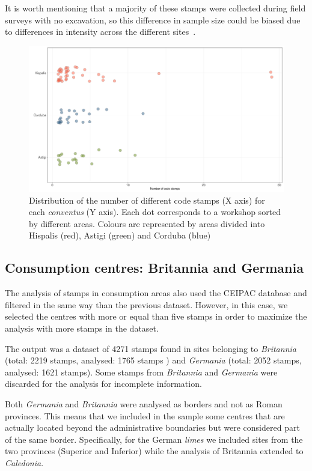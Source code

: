 \documentclass[review]{elsarticle}
\newcommand{\memo}[2]{\textcolor{#1}{#2}}
\newcommand{\xavi}[1]{\memo{magenta}{XRC: #1\\}}
\begin{document}
It is worth mentioning that a majority of these stamps were collected during field surveys with no excavation, so this difference in sample size could be biased due to differences in intensity across the different sites~\citep{arva_1997}.
 
\begin{figure}[htp]
	\centering
\includegraphics[width=\linewidth]{figs/frequency}
\caption{Distribution of the number of different code stamps (X axis) for each \textit{conventus} (Y axis). Each dot corresponds to a workshop sorted by different areas. Colours are represented by areas divided into Hispalis (red), Astigi (green) and Corduba (blue)}
\label{frequency}
\end{figure} 



\subsection{Consumption centres: Britannia and Germania}


The analysis of stamps in consumption areas also used the CEIPAC database and filtered in the same way than the previous dataset. However, in this case, we selected the centres with more or equal than five stamps in order to maximize the analysis with more stamps in the dataset.   


The output was a dataset of 4271 stamps found in sites belonging to \textit{Britannia} (total: 2219 stamps, analysed: 1765 stamps ) and \textit{Germania} (total: 2052 stamps, analysed: 1621 stamps). Some stamps from \textit{Britannia} and \textit{Germania} were discarded for the analysis for incomplete information.  

Both \textit{Germania} and \textit{Britannia} were analysed as borders and not as Roman provinces. This means that we included in the sample some centres that are actually located beyond the administrative boundaries but were considered part of the same border. Specifically, for the German \textit{limes} we included sites from the two provinces (Superior and Inferior) while the analysis of Britannia extended to \textit{Caledonia}.
 
\end{document}
